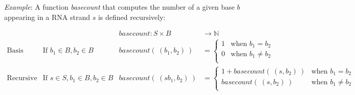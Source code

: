 \documentclass[12pt, oneside]{article}
\newcommand{\A}[0]{\texttt{A}}
\newcommand{\C}[0]{\texttt{C}}
\newcommand{\G}[0]{\texttt{G}}
\newcommand{\U}[0]{\texttt{U}}
\begin{document}
\vfill

{\it Example}: A function \textit{basecount} that computes the number of a given base 
$b$ appearing in a RNA strand $s$ is defined recursively:
    
\[
\begin{array}{llll}
& & \textit{basecount} : S \times B & \to \mathbb{N} \\
\textrm{Basis Step:} &  \textrm{If } b_1 \in B, b_2 \in B & \textit{basecount}(~(b_1, b_2)~) & =
        \begin{cases}
            1 & \textrm{when } b_1 = b_2 \\
            0 & \textrm{when } b_1 \neq b_2 \\
        \end{cases} \\
\textrm{Recursive Step:} & \textrm{If } s \in S, b_1 \in B, b_2 \in B &\textit{basecount}(~(s b_1, b_2)~) & =
        \begin{cases}
            1 + \textit{basecount}(~(s, b_2)~) & \textrm{when } b_1 = b_2 \\
            \textit{basecount}(~(s, b_2)~) & \textrm{when } b_1 \neq b_2 \\
        \end{cases}
\end{array}
\]

\begin{comment}
$basecount(~(\A\C\U,\A)~) = basecount( ~(\A\C, \A)~) = basecount(~(\A, \A)~) = 1$\\


$basecount(~(\A\C\U,\G)~) = basecount( ~(\A\C, \G)~) = basecount(~(\A, \G)~) = 0$\\


\vfill
{\it Extra example}: The function which outputs $2^n$ when given a nonnegative integer $n$ can be defined recursively, 
because its domain is the set of nonnegative integers.

\vfill
\end{comment}
 \vfill
\end{document}
